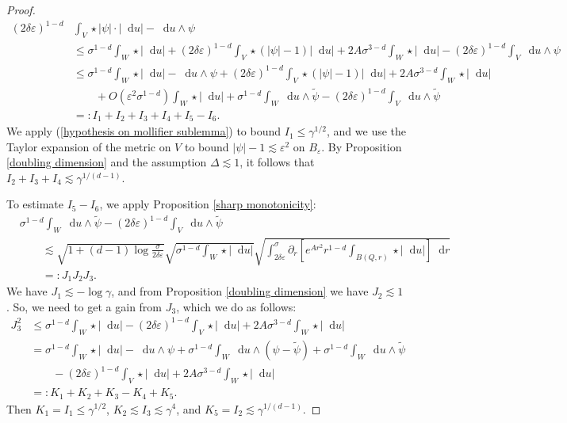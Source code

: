 \documentclass[reqno,10pt]{amsart}
\newcommand*\dif{\mathop{}\!\mathrm{d}}
\theoremstyle{definition}
\numberwithin{equation}{section}
\begin{document}
\begin{proof}
\begin{align*}
(2\delta\varepsilon)^{1 - d} &\int_V \star |\psi| \cdot |\dif u| - \dif u \wedge \psi \\
&\leq \sigma^{1 - d}\int_W \star |\dif u| + (2\delta\varepsilon)^{1 - d} \int_V \star(|\psi| - 1)|\dif u| + 2A\sigma^{3 - d} \int_W \star |\dif u| - (2\delta\varepsilon)^{1 - d}\int_V \dif u \wedge \psi\\
&\leq \sigma^{1 - d}\int_W \star |\dif u| - \dif u \wedge \psi + (2\delta\varepsilon)^{1 - d} \int_V \star(|\psi| - 1)|\dif u| + 2A\sigma^{3 - d} \int_W \star |\dif u| \\
&\qquad + O(\varepsilon^2 \sigma^{1 - d}) \int_W \star |\dif u| + \sigma^{1 - d}\int_W \dif u \wedge \tilde \psi - (2\delta\varepsilon)^{1 - d}\int_V \dif u \wedge \tilde \psi\\
&=: I_1 + I_2 + I_3 + I_4 + I_5 - I_6.
\end{align*}
We apply (\ref{hypothesis on mollifier sublemma}) to bound $I_1 \leq \gamma^{1/2}$, and we use the Taylor expansion of the metric on $V$ to bound $|\psi| - 1 \lesssim \varepsilon^2$ on $B_\varepsilon$.
By Proposition \ref{doubling dimension} and the assumption $\Delta \lesssim 1$, it follows that $I_2 + I_3 + I_4 \lesssim \gamma^{1/(d - 1)}$.

To estimate $I_5 - I_6$, we apply Proposition \ref{sharp monotonicity}:
\begin{align*}
&\sigma^{1 - d} \int_W \dif u \wedge \tilde \psi - (2\delta\varepsilon)^{1 - d} \int_V \dif u \wedge \tilde \psi \\
&\qquad \lesssim \sqrt{1 + (d - 1) \log \frac{\sigma}{2\delta\varepsilon}} \sqrt{\sigma^{1 - d} \int_W \star |\dif u|} \sqrt{\int_{2\delta\varepsilon}^\sigma \partial_r \left[e^{Ar^2} r^{1 - d} \int_{B(Q, r)} \star |\dif u|\right] \dif r}\\
&\qquad =: J_1 J_2 J_3.
\end{align*}
We have $J_1 \lesssim -\log \gamma$, and from Proposition \ref{doubling dimension} we have $J_2 \lesssim 1$.
So, we need to get a gain from $J_3$, which we do as follows:
\begin{align*}
J_3^2 &\leq \sigma^{1 - d} \int_W \star |\dif u| - (2 \delta \varepsilon)^{1 - d} \int_V \star |\dif u| + 2A\sigma^{3 - d} \int_W \star |\dif u| \\
&= \sigma^{1 - d} \int_W \star |\dif u| - \dif u \wedge \psi + \sigma^{1 - d} \int_W \dif u \wedge (\psi - \tilde \psi) + \sigma^{1 - d} \int_W \dif u \wedge \tilde \psi \\
&\qquad - (2 \delta\varepsilon)^{1 - d} \int_V \star |\dif u| + 2A \sigma^{3 - d} \int_W \star |\dif u| \\
&=: K_1 + K_2 + K_3 - K_4 + K_5.
\end{align*}
Then $K_1 = I_1 \leq \gamma^{1/2}$, $K_2 \lesssim I_3 \lesssim \gamma^4$, and $K_5 = I_2 \lesssim \gamma^{1/(d - 1)}$.


\end{proof}
\end{document}
